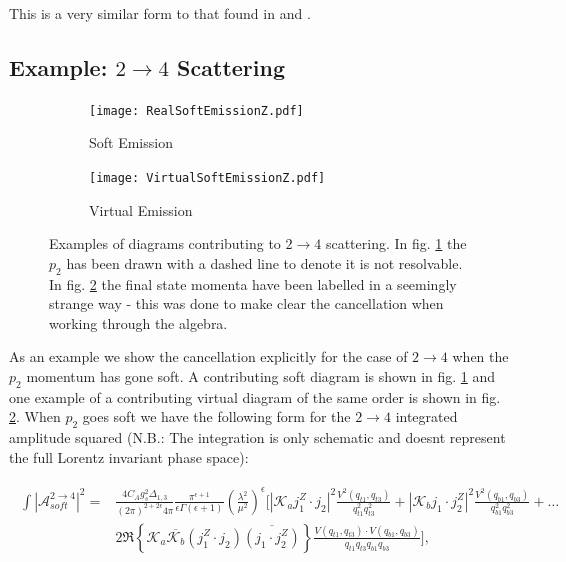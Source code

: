 		This is a very similar form to that found in \cite{Constructing} and \cite{JeppeHiggs}.

	\subsection{Example: $2\rightarrow4$ Scattering}
	\label{sub:2to4Example}

	\begin{figure}[bth!]

		\centering

		\begin{subfigure}[b]{0.5\textwidth}
			\texttt{[image: RealSoftEmissionZ.pdf]}
			\caption{Soft Emission}
			\label{fig:real24}
		\end{subfigure}

		\begin{subfigure}[b]{0.5\textwidth}
			\centering
			\texttt{[image: VirtualSoftEmissionZ.pdf]}
			\caption{Virtual Emission}
			\label{fig:virtual24}
		\end{subfigure}

		\caption{Examples of diagrams contributing to $2\rightarrow4$ scattering.
		In fig. \ref{fig:real24} the $p_2$ has been drawn with a dashed line to denote
		it is not resolvable.  In fig. \ref{fig:virtual24} the final state momenta have
		been labelled in a seemingly strange way - this was done to make clear the
		cancellation when working through the algebra.}

		\label{fig:2to4}
	\end{figure}

	As an example we show the cancellation explicitly for the case of $2\rightarrow4$ when the
	$p_2$ momentum has gone soft.  A contributing soft diagram is shown in fig. \ref{fig:real24} and
	one example of a contributing virtual diagram of the same order is shown in fig. \ref{fig:virtual24}.
	When $p_2$ goes soft we have the following form for the $2\rightarrow4$ integrated amplitude squared
	({N.B.}: The integration is only schematic and doesnt represent the full Lorentz invariant phase space):

	\begin{align}
	\begin{split}
		\int|\mathcal{A}^{2\rightarrow4}_{soft}|^2 = &\frac{4C_Ag_s^2\Delta_{1,3}}{(2\pi)^{2+2\epsilon}4\pi}
		\frac{\pi^{\epsilon+1}}{\epsilon\Gamma(\epsilon+1)}
		\left(\frac{\lambda^2}{\mu^2}\right)^\epsilon\Bigg[|\mathcal{K}_aj_1^Z\cdot j_2|^2
		\frac{V^2(q_{t1}, q_{t3})}{q^2_{t1}q^2_{t3}} + |\mathcal{K}_bj_1\cdot j_2^Z|^2
		\frac{V^2(q_{b1}, q_{b3})}{q^2_{b1}q^2_{b3}} + \ldots \\
		& 2\Re\left\{\mathcal{K}_a\overline{\mathcal{K}_b}
		(j_1^Z\cdot j_2)\overline{(j_1\cdot j_2^Z)}\right\} \frac{V(q_{t1}, q_{t3})
		\cdot V(q_{b1}, q_{b3})}{q_{t1}q_{t3}q_{b1}q_{b3}}\Bigg],
	\end{split}
	\end{align}

